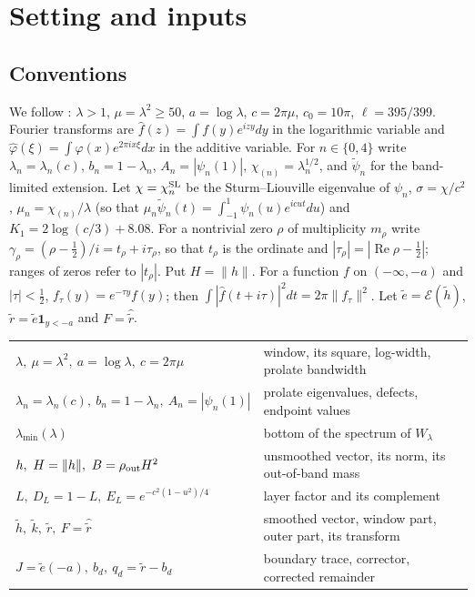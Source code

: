 \documentclass[11pt]{amsart}
\theoremstyle{remark}
\numberwithin{equation}{section}
\newcommand{\E}{\mathcal{E}}
\begin{document}
\section{Setting and inputs}\label{sec:setting}

\subsection{Conventions}
We follow \cite{MoriWeilII}: $\lambda>1$, $\mu=\lambda^2\ge50$, $a=\log\lambda$, $c=2\pi\mu$, $c_0=10\pi$, $\ell=395/399$. Fourier transforms are $\hat f(z)=\int f(y)e^{izy}dy$ in the logarithmic variable and $\hat\varphi(\xi)=\int\varphi(x)e^{2\pi ix\xi}dx$ in the additive variable. For $n\in\{0,4\}$ write $\lambda_n=\lambda_n(c)$, $b_n=1-\lambda_n$, $A_n=|\psi_n(1)|$, $\chi_{(n)}=\lambda_n^{1/2}$, and $\tilde\psi_n$ for the band-limited extension. Let $\chi=\chi_n^{\rm SL}$ be the Sturm--Liouville eigenvalue of $\psi_n$, $\sigma=\chi/c^2$, $\mu_n=\chi_{(n)}/\lambda$ (so that $\mu_n\tilde\psi_n(t)=\int_{-1}^1\psi_n(u)e^{icut}du$) and $K_1=2\log(c/3)+8.08$. For a nontrivial zero $\rho$ of multiplicity $m_\rho$ write $\gamma_\rho=(\rho-\frac12)/i=t_\rho+i\tau_\rho$, so that $t_\rho$ is the ordinate and $|\tau_\rho|=|\operatorname{Re}\rho-\frac12|$; ranges of zeros refer to $|t_\rho|$. Put $H=\|h\|$. For a function $f$ on $(-\infty,-a)$ and $|\tau|<\frac12$, $f_\tau(y)=e^{-\tau y}f(y)$; then $\int|\hat f(t+i\tau)|^2dt=2\pi\|f_\tau\|^2$. Let $\tilde e=\E(\tilde h)$, $\tilde r=\tilde e\mathbf 1_{y<-a}$ and $F=\hat{\tilde r}$.

\begin{table}[h]
\centering\small
\begin{tabular}{ll}
\toprule
$\lambda,\ \mu=\lambda^2,\ a=\log\lambda,\ c=2\pi\mu$ & window, its square, log-width, prolate bandwidth\\
$\lambda_n=\lambda_n(c),\ b_n=1-\lambda_n,\ A_n=|\psi_n(1)|$ & prolate eigenvalues, defects, endpoint values\\
$\lambda_{\min}(\lambda)$ & bottom of the spectrum of $W_\lambda$\\
$h,\ H=\|h\|,\ B=\rho_{\rm out}H^2$ & unsmoothed vector, its norm, its out-of-band mass\\
$L,\ D_L=1-L,\ E_L=e^{-c^2(1-u^2)/4}$ & layer factor and its complement\\
$\tilde h,\ \tilde k,\ \tilde r,\ F=\hat{\tilde r}$ & smoothed vector, window part, outer part, its transform\\
$J=\tilde e(-a),\ b_d,\ q_d=\tilde r-b_d$ & boundary trace, corrector, corrected remainder\\
\bottomrule
\end{tabular}
\end{table}
\end{document}
